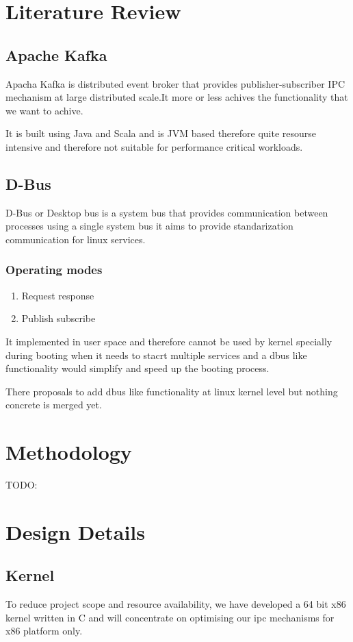 \documentclass[12pt]{report}
\begin{document}
	\chapter{Literature Review}
	\section{Apache Kafka}
	Apacha Kafka is distributed event broker that provides publisher-subscriber 
	IPC mechanism at large distributed scale.It more or less achives the functionality 
	that we want to achive.
	
	It is built using Java and Scala and is JVM based therefore quite resourse intensive
	and therefore not suitable for performance critical workloads.
	
	\section{D-Bus}
	D-Bus or Desktop bus is a system bus that provides communication between processes
	using a single system bus it aims to provide standarization communication for 
	linux services.
	
	\subsection{Operating modes} 
	\begin{enumerate}
		\item Request response
		\item Publish subscribe
	\end{enumerate} 
	
	It implemented in user space and therefore cannot be used by kernel specially during
	booting when it needs to stacrt multiple services and a dbus like functionality would
	simplify and speed up the booting process.
	
	There proposals to add dbus like functionality at linux kernel level but nothing
	concrete is merged yet\cite{citation03}.	
	
    \chapter{Methodology}
    TODO:
    
    \chapter{Design Details}
		
	\section{Kernel}
	To reduce project scope and resource availability, 
	we have developed a 64 bit x86 kernel written in C and will concentrate 
	on optimising our ipc mechanisms for x86 platform only.
	
\end{document}
